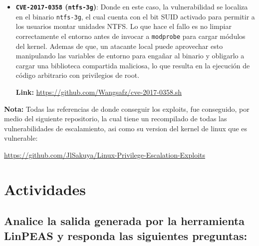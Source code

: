 \documentclass[letterpaper,11pt]{article}
\begin{document}
\begin{itemize}
  \textbf{Link:} \url{https://github.com/PwnFunction/CVE-2021-4034}

  \item \textbf{\texttt{CVE-2017-0358} (\texttt{ntfs-3g})}: Donde en este caso, la vulnerabilidad se localiza en el binario \texttt{ntfs-3g}, el cual cuenta con el bit SUID activado para permitir a los usuarios montar unidades NTFS. Lo que hace el fallo es no limpiar correctamente el entorno antes de invocar a \texttt{modprobe} para cargar módulos del kernel. Ademas de que, un atacante local puede aprovechar esto manipulando las variables de entorno para engañar al binario y obligarlo a cargar una biblioteca compartida maliciosa, lo que resulta en la ejecución de código arbitrario con privilegios de root.
  
\textbf{Link:} \url{https://github.com/Wangsafz/cve-2017-0358.sh}

\end{itemize}

\textbf{Nota:} Todas las referencias de donde conseguir los exploits, fue conseguido, por medio del siguiente 
repositorio, la cual tiene un recompilado de todas las vulnerabilidades de escalamiento, asi 
como su version del kernel de linux que es vulnerable: 

\url{https://github.com/JlSakuya/Linux-Privilege-Escalation-Exploits}


\section{Actividades}

\subsection{Analice la salida generada por la herramienta LinPEAS y responda las siguientes preguntas:}
\end{document}

